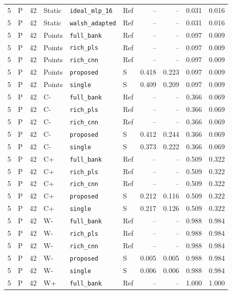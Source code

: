 \documentclass[10pt,a4paper]{article}
\begin{document}
\begin{landscape}
\begin{longtable}{rlrlllrrrr}
5 & P & 42 & Static & \texttt{ideal\_mlp\_16} & Ref & -- & -- & 0.031 & 0.016 \\
5 & P & 42 & Static & \texttt{walsh\_adapted} & Ref & -- & -- & 0.031 & 0.016 \\
5 & P & 42 & Points & \texttt{full\_bank} & Ref & -- & -- & 0.097 & 0.009 \\
5 & P & 42 & Points & \texttt{rich\_pls} & Ref & -- & -- & 0.097 & 0.009 \\
5 & P & 42 & Points & \texttt{rich\_cnn} & Ref & -- & -- & 0.097 & 0.009 \\
5 & P & 42 & Points & \texttt{proposed} & S & 0.418 & 0.223 & 0.097 & 0.009 \\
5 & P & 42 & Points & \texttt{single} & S & 0.409 & 0.209 & 0.097 & 0.009 \\
5 & P & 42 & C- & \texttt{full\_bank} & Ref & -- & -- & 0.366 & 0.069 \\
5 & P & 42 & C- & \texttt{rich\_pls} & Ref & -- & -- & 0.366 & 0.069 \\
5 & P & 42 & C- & \texttt{rich\_cnn} & Ref & -- & -- & 0.366 & 0.069 \\
5 & P & 42 & C- & \texttt{proposed} & S & 0.412 & 0.244 & 0.366 & 0.069 \\
5 & P & 42 & C- & \texttt{single} & S & 0.373 & 0.222 & 0.366 & 0.069 \\
5 & P & 42 & C+ & \texttt{full\_bank} & Ref & -- & -- & 0.509 & 0.322 \\
5 & P & 42 & C+ & \texttt{rich\_pls} & Ref & -- & -- & 0.509 & 0.322 \\
5 & P & 42 & C+ & \texttt{rich\_cnn} & Ref & -- & -- & 0.509 & 0.322 \\
5 & P & 42 & C+ & \texttt{proposed} & S & 0.212 & 0.116 & 0.509 & 0.322 \\
5 & P & 42 & C+ & \texttt{single} & S & 0.217 & 0.126 & 0.509 & 0.322 \\
5 & P & 42 & W- & \texttt{full\_bank} & Ref & -- & -- & 0.988 & 0.984 \\
5 & P & 42 & W- & \texttt{rich\_pls} & Ref & -- & -- & 0.988 & 0.984 \\
5 & P & 42 & W- & \texttt{rich\_cnn} & Ref & -- & -- & 0.988 & 0.984 \\
5 & P & 42 & W- & \texttt{proposed} & S & 0.005 & 0.005 & 0.988 & 0.984 \\
5 & P & 42 & W- & \texttt{single} & S & 0.006 & 0.006 & 0.988 & 0.984 \\
5 & P & 42 & W+ & \texttt{full\_bank} & Ref & -- & -- & 1.000 & 1.000 \\

\end{longtable}
\end{landscape}
\end{document}

